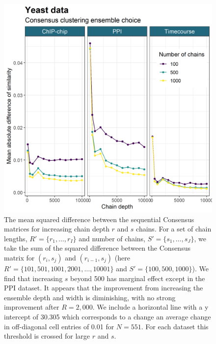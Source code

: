\documentclass[]{article}
\begin{document}
\begin{figure}
	\centering
	\includegraphics[scale=0.6]{./Images/Yeast/EnsembleChoicePlotAlt.png}
	\caption{The mean squared difference between the sequential Consensus matrices for increasing chain depth $r$ and $s$ chains. For a set of chain lengths, $R'=\{r_1, \ldots, r_I\}$ and number of chains, $S'=\{s_1, \ldots, s_J\}$, we take the sum of the squared difference between the Consensus matrix for $(r_i, s_j)$ and $(r_{i-1}, s_{j})$ (here $R'=\{101, 501, 1001, 2001, \ldots, 10001\}$ and $S'=\{100, 500, 1000\}$). 
	We find that increasing $s$ beyond 500 has marginal effect except in the PPI dataset.
	It appears that the improvement from increasing the ensemble depth and width is diminishing, with no strong improvement after $R=2,000$. We include a horizontal line with a y intercept of 30.305 which corresponds to a change an average change in off-diagonal cell entries of 0.01 for $N=551$. For each dataset this threshold is crossed for large $r$ and $s$.}
	\label{fig:ensembleChoice}
\end{figure}
\end{document}
